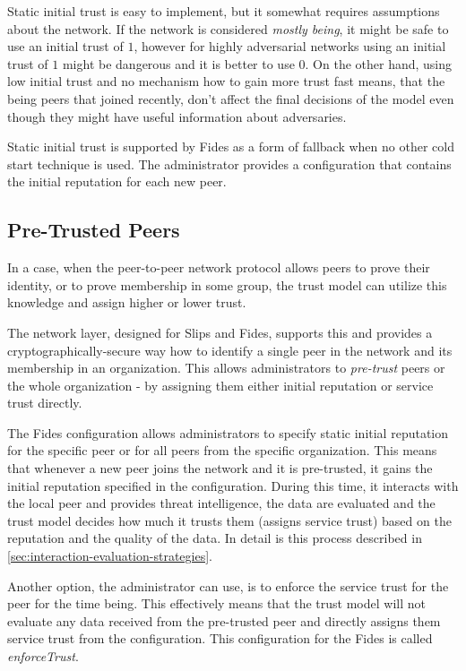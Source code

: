 Static initial trust is easy to implement, but it somewhat requires assumptions about the network. If the network is considered \textit{mostly being}, it might be safe to use an initial trust of $1$, however for highly adversarial networks using an initial trust of $1$ might be dangerous and it is better to use $0$. 
On the other hand, using low initial trust and no mechanism how to gain more trust fast means, that the being peers that joined recently, don't affect the final decisions of the model even though they might have useful information about adversaries.

Static initial trust is supported by Fides as a form of fallback when no other cold start technique is used. The administrator provides a configuration that contains the initial reputation for each new peer.

\subsection{Pre-Trusted Peers}
\label{subsec:pre-trusted-peers}
In a case, when the peer-to-peer network protocol allows peers to prove their identity, or to prove membership in some group, the trust model can utilize this knowledge and assign higher or lower trust.

The network layer, designed for Slips and Fides, supports this\cite{nl} and provides a cryptographically-secure way how to identify a single peer in the network and its membership in an organization.
This allows administrators to \textit{pre-trust} peers or the whole organization - by assigning them either initial reputation or service trust directly.

The Fides configuration allows administrators to specify static initial reputation for the specific peer or for all peers from the specific organization. 
This means that whenever a new peer joins the network and it is pre-trusted, it gains the initial reputation specified in the configuration.
During this time, it interacts with the local peer and provides threat intelligence, the data are evaluated and the trust model decides how much it trusts them (assigns service trust) based on the reputation and the quality of the data. In detail is this process described in \ref{sec:interaction-evaluation-strategies}.

Another option, the administrator can use, is to enforce the service trust for the peer for the time being. This effectively means that the trust model will not evaluate any data received from the pre-trusted peer and directly assigns them service trust from the configuration. This configuration for the Fides is called \textit{enforceTrust}.

